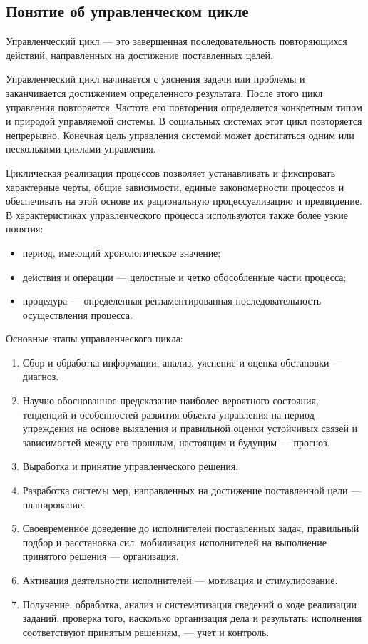 \documentclass[a4paper,12pt,oneside,final]{extarticle}
\numberwithin{equation}{section}
\begin{document}
\subsection{Понятие об управленческом цикле}
Управленческий цикл — это завершенная последовательность повторяющихся действий, направленных на достижение поставленных целей.

Управленческий цикл начинается с уяснения задачи или проблемы и заканчивается достижением определенного результата. 
После этого цикл управления повторяется. Частота его повторения определяется конкретным типом и природой управляемой системы. 
В социальных системах этот цикл повторяется непрерывно. 
Конечная цель управления системой может достигаться одним или несколькими циклами управления.

Циклическая реализация процессов позволяет устанавливать и фиксировать характерные черты, общие зависимости, единые закономерности процессов и обеспечивать на этой основе их рациональную процессуализацию и предвидение.
В характеристиках управленческого процесса используются также более узкие понятия:

\begin{itemize}
	\item период, имеющий хронологическое значение;
	\item действия и операции --- целостные и четко обособленные части процесса;
	\item процедура --- определенная регламентированная последовательность осуществления процесса.
\end{itemize}

Основные этапы управленческого цикла:
\begin{enumerate}
	\item Сбор и обработка информации, анализ, уяснение и оценка обстановки — диагноз.
	\item Научно обоснованное предсказание наиболее вероятного состояния, тенденций и особенностей развития объекта управления на период упреждения на основе выявления и правильной оценки устойчивых связей и зависимостей между его прошлым, настоящим и будущим — прогноз.
	\item Выработка и принятие управленческого решения.
	\item Разработка системы мер, направленных на достижение поставленной цели — планирование.
	\item Своевременное доведение до исполнителей поставленных задач, правильный подбор и расстановка сил, мобилизация исполнителей на выполнение принятого решения — организация.
	\item Активация деятельности исполнителей — мотивация и стимулирование.
	\item Получение, обработка, анализ и систематизация сведений о ходе реализации заданий, проверка того, насколько организация дела и результаты исполнения соответствуют принятым решениям, — учет и контроль.
\end{enumerate}
\end{document}
